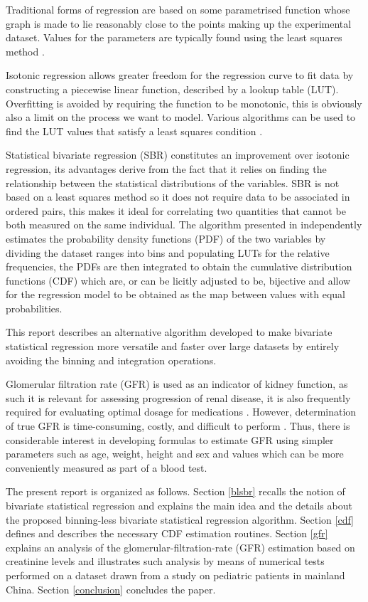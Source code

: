 \documentclass[10pt,final]{siamltex}
\begin{document}
Traditional forms of regression are based on some parametrised function whose graph is made to lie reasonably close to the points making up the experimental dataset. Values for the parameters are typically found using the least squares method \cite{book}.

Isotonic regression allows greater freedom for the regression curve to fit data by constructing a piecewise linear function, described by a lookup table (LUT). Overfitting is avoided by requiring the function to be monotonic, this is obviously also a limit on the process we want to model. Various algorithms can be used to find the LUT values that satisfy a least squares condition \cite{bestchak, pava}.

Statistical bivariate regression (SBR) constitutes an improvement over isotonic regression, its advantages derive from the fact that it relies on finding the relationship between the statistical distributions of the variables. SBR is not based on a least squares method so it does not require data to be associated in ordered pairs, this makes it ideal for correlating two quantities that cannot be both measured on the same individual. The algorithm presented in \cite{fiori} independently estimates the probability density functions (PDF) of the two variables by dividing the dataset ranges into bins and populating LUTs for the relative frequencies, the PDFs are then integrated to obtain the cumulative distribution functions (CDF) which are, or can be licitly adjusted to be, bijective and allow for the regression model to be obtained as the map between values with equal probabilities.

This report describes an alternative algorithm developed to make bivariate statistical regression more versatile and faster over large datasets by entirely avoiding the binning and integration operations.

Glomerular filtration rate (GFR) is used as an indicator of kidney function, as such it is relevant for assessing progression of renal disease, it is also frequently required for evaluating optimal dosage for medications \cite{gfralb, gfrmed}. However, determination of true GFR is time-consuming, costly, and difficult to perform \cite{mgfr, mgfr2}. Thus, there is considerable interest in developing formulas to estimate GFR using simpler parameters such as age, weight, height and sex and values which can be more conveniently measured as part of a blood test.

The present report is organized as follows. Section \ref{blsbr} recalls the notion of bivariate statistical regression and explains the main idea and the details about the proposed binning-less bivariate statistical regression algorithm. Section \ref{cdf} defines and describes the necessary CDF estimation routines. Section \ref{gfr} explains an analysis of the glomerular-filtration-rate (GFR) estimation based on creatinine levels and illustrates such analysis by means of numerical tests performed on a dataset drawn from a study on pediatric patients in mainland China. Section \ref{conclusion} concludes the paper.
%
\end{document}
